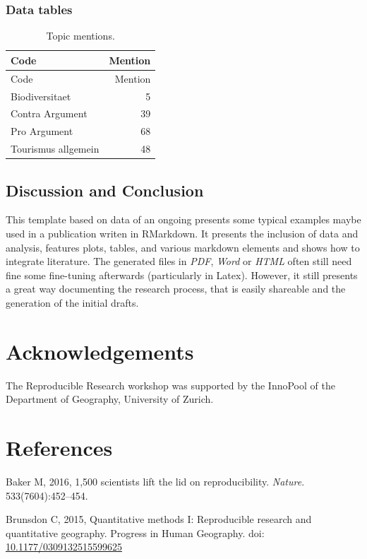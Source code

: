 \documentclass[]{article}
\begin{document}
\subsubsection{Data tables}\label{data-tables}

\begin{longtable}[c]{@{}lr@{}}
\caption{Topic mentions.}\tabularnewline
\toprule
Code & Mention\tabularnewline
\midrule
\endfirsthead
\toprule
Code & Mention\tabularnewline
\midrule
\endhead
Biodiversitaet & 5\tabularnewline
Contra Argument & 39\tabularnewline
Pro Argument & 68\tabularnewline
Tourismus allgemein & 48\tabularnewline
\bottomrule
\end{longtable}

\subsection{Discussion and Conclusion}\label{discussion-and-conclusion}

This template based on data of an ongoing presents some typical examples
maybe used in a publication writen in RMarkdown. It presents the
inclusion of data and analysis, features plots, tables, and various
markdown elements and shows how to integrate literature. The generated
files in \emph{PDF}, \emph{Word} or \emph{HTML} often still need fine
some fine-tuning afterwards (particularly in Latex). However, it still
presents a great way documenting the research process, that is easily
shareable and the generation of the initial drafts.

\section{Acknowledgements}\label{acknowledgements}

The Reproducible Research workshop was supported by the InnoPool of the
Department of Geography, University of Zurich.

\section*{References}\label{references}

\hypertarget{refs}{}
\hypertarget{ref-Baker2016}{}
Baker M, 2016, 1,500 scientists lift the lid on reproducibility.
\emph{Nature}. 533(7604):452--454.

\hypertarget{ref-Brunsdon2015}{}
Brunsdon C, 2015, Quantitative methods I: Reproducible research and
quantitative geography. Progress in Human Geography. doi:
\href{https://doi.org/10.1177/0309132515599625}{10.1177/0309132515599625}
\end{document}
